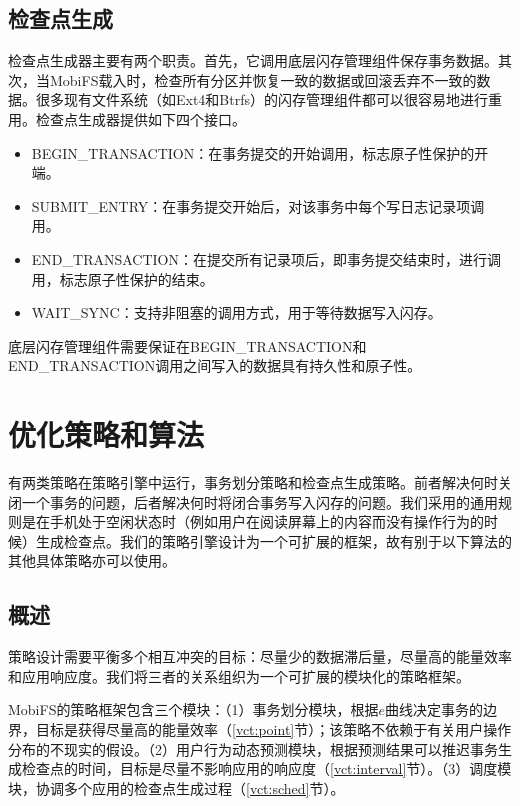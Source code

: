 \subsection{检查点生成}

检查点生成器主要有两个职责。首先，它调用底层闪存管理组件保存事务数据。其次，当MobiFS载入时，检查所有分区并恢复一致的数据或回滚丢弃不一致的数据。很多现有文件系统（如Ext4和Btrfs）的闪存管理组件都可以很容易地进行重用。检查点生成器提供如下四个接口。 

\begin{itemize}
\item BEGIN\_TRANSACTION：在事务提交的开始调用，标志原子性保护的开端。 
\item SUBMIT\_ENTRY：在事务提交开始后，对该事务中每个写日志记录项调用。 
\item END\_TRANSACTION：在提交所有记录项后，即事务提交结束时，进行调用，标志原子性保护的结束。 
\item WAIT\_SYNC：支持非阻塞的调用方式，用于等待数据写入闪存。 
\end{itemize}

底层闪存管理组件需要保证在BEGIN\_TRANSACTION和END\_TRANSACTION调用之间写入的数据具有持久性和原子性。 

\section{优化策略和算法}

有两类策略在策略引擎中运行，事务划分策略和检查点生成策略。前者解决何时关闭一个事务的问题，后者解决何时将闭合事务写入闪存的问题。我们采用的通用规则是在手机处于空闲状态时（例如用户在阅读屏幕上的内容而没有操作行为的时候）生成检查点。我们的策略引擎设计为一个可扩展的框架，故有别于以下算法的其他具体策略亦可以使用。

\subsection{概述}

策略设计需要平衡多个相互冲突的目标：尽量少的数据滞后量，尽量高的能量效率和应用响应度。我们将三者的关系组织为一个可扩展的模块化的策略框架。 

MobiFS的策略框架包含三个模块：（1）事务划分模块，根据$e$曲线决定事务的边界，目标是获得尽量高的能量效率（\ref{vct:point}节）；该策略不依赖于有关用户操作分布的不现实的假设。（2）用户行为动态预测模块，根据预测结果可以推迟事务生成检查点的时间，目标是尽量不影响应用的响应度（\ref{vct:interval}节）。（3）调度模块，协调多个应用的检查点生成过程（\ref{vct:sched}节）。 
 
